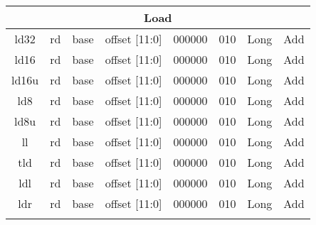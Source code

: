 \documentclass{article}
\begin{document}
\begin{center}
\begin{longtable}{|c|l|r|l|r|l|r|l|r|l|r|c|c|}
                        \multicolumn{13}{|c|}{Load} \\
    \hline ld32     &   \multicolumn{2}{|c|}{rd}    &   \multicolumn{2}{|c|}{base}  &   \multicolumn{2}{|c|}{offset [11:0]} &   \multicolumn{2}{|c|}{000000}    &   \multicolumn{2}{|c|}{010}   &   Long    &   Add \\
    \hline ld16     &   \multicolumn{2}{|c|}{rd}    &   \multicolumn{2}{|c|}{base}  &   \multicolumn{2}{|c|}{offset [11:0]} &   \multicolumn{2}{|c|}{000000}    &   \multicolumn{2}{|c|}{010}   &   Long    &   Add \\
    \hline ld16u    &   \multicolumn{2}{|c|}{rd}    &   \multicolumn{2}{|c|}{base}  &   \multicolumn{2}{|c|}{offset [11:0]} &   \multicolumn{2}{|c|}{000000}    &   \multicolumn{2}{|c|}{010}   &   Long    &   Add \\
    \hline ld8      &   \multicolumn{2}{|c|}{rd}    &   \multicolumn{2}{|c|}{base}  &   \multicolumn{2}{|c|}{offset [11:0]} &   \multicolumn{2}{|c|}{000000}    &   \multicolumn{2}{|c|}{010}   &   Long    &   Add \\
    \hline ld8u     &   \multicolumn{2}{|c|}{rd}    &   \multicolumn{2}{|c|}{base}  &   \multicolumn{2}{|c|}{offset [11:0]} &   \multicolumn{2}{|c|}{000000}    &   \multicolumn{2}{|c|}{010}   &   Long    &   Add \\
    \hline ll       &   \multicolumn{2}{|c|}{rd}    &   \multicolumn{2}{|c|}{base}  &   \multicolumn{2}{|c|}{offset [11:0]} &   \multicolumn{2}{|c|}{000000}    &   \multicolumn{2}{|c|}{010}   &   Long    &   Add \\
    \hline tld      &   \multicolumn{2}{|c|}{rd}    &   \multicolumn{2}{|c|}{base}  &   \multicolumn{2}{|c|}{offset [11:0]} &   \multicolumn{2}{|c|}{000000}    &   \multicolumn{2}{|c|}{010}   &   Long    &   Add \\
    \hline ldl      &   \multicolumn{2}{|c|}{rd}    &   \multicolumn{2}{|c|}{base}  &   \multicolumn{2}{|c|}{offset [11:0]} &   \multicolumn{2}{|c|}{000000}    &   \multicolumn{2}{|c|}{010}   &   Long    &   Add \\
    \hline ldr      &   \multicolumn{2}{|c|}{rd}    &   \multicolumn{2}{|c|}{base}  &   \multicolumn{2}{|c|}{offset [11:0]} &   \multicolumn{2}{|c|}{000000}    &   \multicolumn{2}{|c|}{010}   &   Long    &   Add \\
    
    \hline          \multicolumn{13}{c}{} \\
    

\end{longtable}
\end{center}
\end{document}
